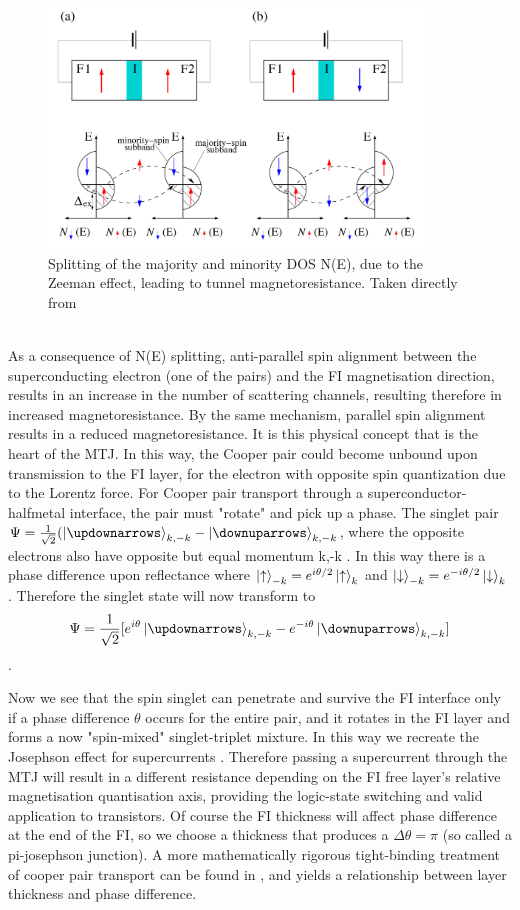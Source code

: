 \documentclass[12pt]{article}
\begin{document}
\begin{figure}[htp]
    \centering
    \begin{measuredfigure}
    \includegraphics[width=10cm]{dos}
    \caption{Splitting of the majority and minority DOS N(E), due to the Zeeman effect, leading to tunnel magnetoresistance. Taken directly from \cite{fundapp}}
    \end{measuredfigure}
    \end{figure}
\\
As a consequence of N(E) splitting, anti-parallel spin alignment between the superconducting electron (one of the pairs) and the FI magnetisation direction, results in an increase in the number of scattering channels, resulting therefore in increased magnetoresistance. By the same mechanism, parallel spin alignment results in a reduced magnetoresistance. It is this physical concept that is the heart of the MTJ. In this way, the Cooper pair could become unbound upon transmission to the FI layer, for the electron with opposite spin quantization due to the Lorentz force. For Cooper pair transport through a superconductor-halfmetal interface, the pair must "rotate" and pick up a phase. The singlet pair $\Psi=\frac{1}{\sqrt{2}}(\ket{\updownarrows}_{k,-k}- \ket{\downuparrows}_{k,-k}$, where the opposite electrons also have opposite but equal momentum k,-k \cite{BCS}. In this way there is a phase difference upon reflectance where $\ket{\uparrow}_{-k}=e^{i\theta/2}\ket{\uparrow}_k$ and $\ket{\downarrow}_{-k}=e^{-i\theta/2}\ket{\downarrow}_k$ \cite{contact}. Therefore the singlet state will now transform to $$\Psi=\frac{1}{\sqrt{2}}[e^{i\theta}\ket{\updownarrows}_{k,-k}- e^{-i\theta}\ket{\downuparrows}_{k,-k}]$$. 

Now we see that the spin singlet can penetrate and survive the FI interface only if a phase difference $\theta$ occurs for the entire pair, and it rotates in the FI layer and forms a now "spin-mixed" singlet-triplet mixture. In this way we recreate the Josephson effect for supercurrents \cite{josephson}. Therefore passing a supercurrent through the MTJ will result in a different resistance depending on the FI free layer's relative magnetisation quantisation axis, providing the logic-state switching and valid application to transistors. Of course the FI thickness will affect phase difference at the end of the FI, so we choose a thickness that produces a $\Delta\theta=\pi$ (so called a pi-josephson junction). A more mathematically rigorous tight-binding treatment of cooper pair transport can be found in \cite{JMTJpi}, and yields a relationship between layer thickness and phase difference.
\end{document}
